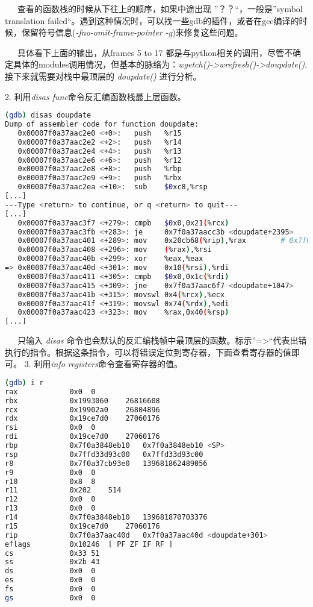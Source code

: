 \documentclass[12pt]{article}  %
\begin{document}
\ \ \ 查看的函数栈的时候从下往上的顺序，如果中途出现 ”？？“，一般是”symbol translation failed“。遇到这种情况时，可以找一些gdb的插件，或者在gcc编译的时候，保留符号信息(\emph{-fno-omit-frame-pointer -g})来修复这些问题。\par
\ \ \ 具体看下上面的输出，从frames 5 to 17 都是与python相关的调用，尽管不确定具体的modules调用情况，但基本的脉络为：\emph{wgetch()->wrefresh()->doupdate()},接下来就需要对栈中最顶层的 \emph{doupdate()} 进行分析。\par
2. 利用\emph{disas func}命令反汇编函数栈最上层函数。\par
\begin{lstlisting}[language=sh]
(gdb) disas doupdate
Dump of assembler code for function doupdate:
   0x00007f0a37aac2e0 <+0>:   push   %r15
   0x00007f0a37aac2e2 <+2>:   push   %r14
   0x00007f0a37aac2e4 <+4>:   push   %r13
   0x00007f0a37aac2e6 <+6>:   push   %r12
   0x00007f0a37aac2e8 <+8>:   push   %rbp
   0x00007f0a37aac2e9 <+9>:   push   %rbx
   0x00007f0a37aac2ea <+10>:  sub    $0xc8,%rsp
[...]
---Type <return> to continue, or q <return> to quit---
[...]
   0x00007f0a37aac3f7 <+279>: cmpb   $0x0,0x21(%rcx)
   0x00007f0a37aac3fb <+283>: je     0x7f0a37aacc3b <doupdate+2395>
   0x00007f0a37aac401 <+289>: mov    0x20cb68(%rip),%rax        # 0x7f0a37cb8f70
   0x00007f0a37aac408 <+296>: mov    (%rax),%rsi
   0x00007f0a37aac40b <+299>: xor    %eax,%eax
=> 0x00007f0a37aac40d <+301>: mov    0x10(%rsi),%rdi
   0x00007f0a37aac411 <+305>: cmpb   $0x0,0x1c(%rdi)
   0x00007f0a37aac415 <+309>: jne    0x7f0a37aac6f7 <doupdate+1047>
   0x00007f0a37aac41b <+315>: movswl 0x4(%rcx),%ecx
   0x00007f0a37aac41f <+319>: movswl 0x74(%rdx),%edi
   0x00007f0a37aac423 <+323>: mov    %rax,0x40(%rsp)
[...]

\end{lstlisting}
\ \ \ 只输入 \emph{disas} 命令也会默认的反汇编栈帧中最顶层的函数。标示”=>“代表出错执行的指令。根据这条指令，可以将错误定位到寄存器，下面查看寄存器的值即可。
3. 利用\emph{info registers}命令查看寄存器的值。\par
\begin{lstlisting}[language=sh]
(gdb) i r
rax            0x0  0
rbx            0x1993060    26816608
rcx            0x19902a0    26804896
rdx            0x19ce7d0    27060176
rsi            0x0  0
rdi            0x19ce7d0    27060176
rbp            0x7f0a3848eb10   0x7f0a3848eb10 <SP>
rsp            0x7ffd33d93c00   0x7ffd33d93c00
r8             0x7f0a37cb93e0   139681862489056
r9             0x0  0
r10            0x8  8
r11            0x202    514
r12            0x0  0
r13            0x0  0
r14            0x7f0a3848eb10   139681870703376
r15            0x19ce7d0    27060176
rip            0x7f0a37aac40d   0x7f0a37aac40d <doupdate+301>
eflags         0x10246  [ PF ZF IF RF ]
cs             0x33 51
ss             0x2b 43
ds             0x0  0
es             0x0  0
fs             0x0  0
gs             0x0  0
\end{lstlisting}
\end{document}
